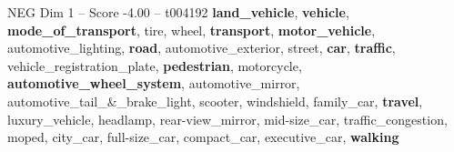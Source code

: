 \begin{textsample}{NEG Dim 1 – Score -4.00 – t004192}  \label{ex:f1_neg_012}
\textbf{land\_vehicle}, \textbf{vehicle}, \textbf{mode\_of\_transport}, tire, wheel, \textbf{transport}, \textbf{motor\_vehicle}, automotive\_lighting, \textbf{road}, automotive\_exterior, street, \textbf{car}, \textbf{traffic}, vehicle\_registration\_plate, \textbf{pedestrian}, motorcycle, \textbf{automotive\_wheel\_system}, automotive\_mirror, automotive\_tail\_\&\_brake\_light, scooter, windshield, family\_car, \textbf{travel}, luxury\_vehicle, headlamp, rear-view\_mirror, mid-size\_car, traffic\_congestion, moped, city\_car, full-size\_car, compact\_car, executive\_car, \textbf{walking}

\end{textsample}
